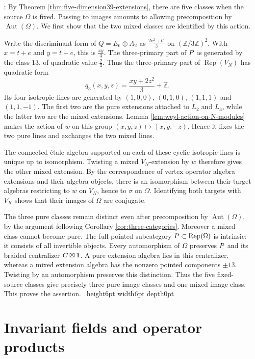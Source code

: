\documentclass[leqno]{article}
\let\cal\relax
\newcommand{\cal}{\mathcal}
\newcommand{\Z}{\ensuremath{\mathbb{Z}}}
\newcommand{\qed}{\hfill \vrule height6pt  width6pt depth0pt}
\DeclareMathOperator{\Rep}{Rep}
\newenvironment{proof}[1][]{\noindent {\it Proof #1} : }{\hbox{~}\qed
\smallskip
}
\numberwithin{equation}{section}
\begin{document}
\begin{proof}
By Theorem \ref{thm:five-dimension39-extensions}, there are five classes when the source $\Omega$ is fixed. Passing to images amounts to allowing precomposition by $\operatorname{Aut}(\Omega)$. We first show that the two mixed classes are identified by this action.

Write the discriminant form of $Q = E_6\oplus A_2$ as $\frac{2e^2+t^2}{3}$ on $(\Z/3\Z)^2$. With $x = t+e$ and $y = t-e$, this is $\frac{xy}{3}$. The three-primary part of $\cal P$ is generated by the class $13$, of quadratic value $\frac23$. Thus the three-primary part of $\Rep(V_N)$ has quadratic form
\[
q_3(x,y,z) = \frac{xy+2z^2}{3}+\Z.
\]
Its four isotropic lines are generated by $(1,0,0)$, $(0,1,0)$, $(1,1,1)$ and $(1,1,-1)$. The first two are the pure extensions attached to $L_2$ and $L_3$, while the latter two are the mixed extensions. Lemma \ref{lem:weyl-action-on-N-modules} makes the action of $w$ on this group $(x,y,z) \mapsto (x,y,-z)$. Hence it fixes the two pure lines and exchanges the two mixed lines.

The connected \'etale algebra supported on each of these cyclic isotropic lines is unique up to isomorphism. Twisting a mixed $V_N$-extension by $w$ therefore gives the other mixed extension. By the correspondence of vertex operator algebra extensions and their algebra objects, there is an isomorphism between their target algebras restricting to $w$ on $V_N$, hence to $\sigma$ on $\Omega$. Identifying both targets with $V_K$ shows that their images of $\Omega$ are conjugate.

The three pure classes remain distinct even after precomposition by $\operatorname{Aut}(\Omega)$, by the argument following Corollary \ref{cor:three-categories}. Moreover a mixed class cannot become pure. The full pointed subcategory $\cal P \subset \Rep(\Omega)$ is intrinsic: it consists of all invertible objects. Every automorphism of $\Omega$ preserves $\cal P$ and its braided centralizer $\cal C\boxtimes\mathbf1$. A pure extension algebra lies in this centralizer, whereas a mixed extension algebra has the nonzero pointed components $\pm13$. Twisting by an automorphism preserves this distinction. Thus the five fixed-source classes give precisely three pure image classes and one mixed image class. This proves the assertion.
\end{proof}

\section{Invariant fields and operator products}
\label{sec:invariant-fields}
\end{document}
